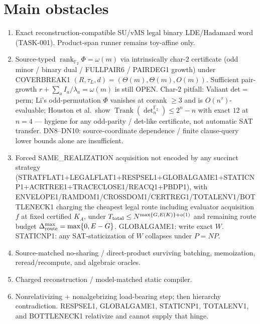 \documentclass[11pt]{article}
\begin{document}
\section*{Main obstacles}
\begin{enumerate}
\item Exact reconstruction-compatible SU/vMS legal binary LDE/Hadamard word
(TASK-001). Product-span runner remains toy-affine only.
\item Source-typed $\operatorname{rank}_{\mathbb F_2}\Phi=\omega(m)$ via
intrinsically char-$2$ certificate (odd minor / binary dual / FULLPAIR6 /
PAIRDEG1 growth) under COVERBREAK1
$(R,\tau_L,d)=(\Theta(m),\Theta(m),O(m))$. Sufficient pair-growth
$r+\sum_a I_a/\lambda_a=\omega(m)$ is still OPEN. Char-$2$ pitfall: Valiant
det$=$perm; Li's odd-permutation $\Phi$ vanishes at corank $\ge 3$ and is
$O(n^{\tau})$-evaluable; Houston et al.\ show $\operatorname{Trank}(\det_n^{\mathbb F_2})\le 2^n-n$
with exact $12$ at $n=4$ --- hygiene for any odd-parity / det-like certificate,
not automatic SAT transfer. DN8--DN10: source-coordinate dependence / finite
clause-query lower bounds alone are insufficient.
\item Forced SAME\_REALIZATION acquisition not encoded by any succinct strategy
(STRATFLAT1+LEGALFLAT1+RESPSEL1+GLOBALGAME1+STATICNP1+ACRTREE1+TRACECLOSE1/REACQ1+PBDP1),
with ENVELOPE1/RAMDOM1/CROSSDOM1/CERTREG1/TOTALENV1/BOTTLENECK1 charging the
cheapest legal route including evaluator acquisition $f$ at fixed certified
$K_A$, under $T_{\rm total}\le N^{\max\{G,E(K)\}+o(1)}$ and remaining route
budget $\Delta_{\rm route}^{\max}=\max\{0,E-G\}$. GLOBALGAME1: write exact $W$.
STATICNP1: any SAT-staticization of $W$ collapses under $P=NP$.
\item Source-matched no-sharing / direct-product surviving batching, memoization,
reread/recompute, and algebraic oracles.
\item Charged reconstruction / model-matched static compiler.
\item Nonrelativizing + nonalgebrizing load-bearing step; then hierarchy
contradiction. RESPSEL1, GLOBALGAME1, STATICNP1, TOTALENV1, and BOTTLENECK1
relativize and cannot supply that hinge.
\end{enumerate}
\end{document}
